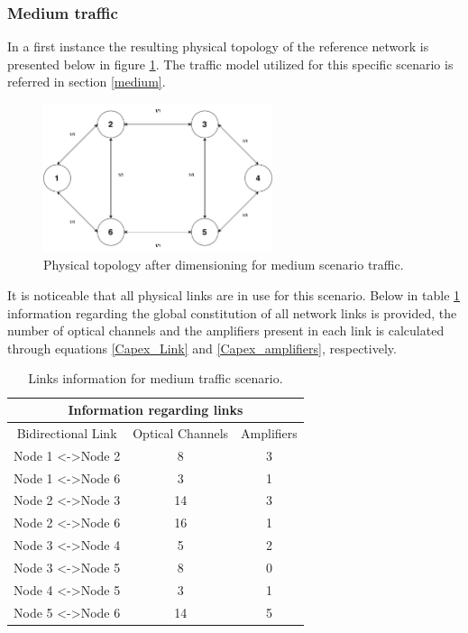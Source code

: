 \subsubsection{Medium traffic}

In a first instance the resulting physical topology of the reference network is presented below in figure \ref{mediumPhysicalTopology}. The traffic model utilized for this specific scenario is referred in section \ref{medium}.

\begin{figure}[H]
  \begin{center}
    \includegraphics[width=0.6\textwidth]{fig/logos/lowPhysicalTopology.pdf}
    \caption{Physical topology after dimensioning for medium scenario traffic.}
  \end{center}
  \label{mediumPhysicalTopology}
\end{figure}

It is noticeable that all physical links are in use for this scenario. Below in table \ref{mediumLinks} information regarding the global constitution of all network links is provided, the number of optical channels and the amplifiers present in each link is calculated through equations \ref{Capex_Link} and \ref{Capex_amplifiers}, respectively.


\begin{table}[H]
\centering
\begin{tabular}{|c|c|c|}
\hline
\multicolumn{3}{|c|}{Information regarding links} \\ \hline
Bidirectional Link & Optical Channels & Amplifiers \\ \hline
Node 1 \textless{}-\textgreater Node 2 & 8 & 3 \\ \hline
Node 1 \textless{}-\textgreater Node 6 & 3 & 1 \\ \hline
Node 2 \textless{}-\textgreater Node 3 & 14 & 3 \\ \hline
Node 2 \textless{}-\textgreater Node 6 & 16 & 1 \\ \hline
Node 3 \textless{}-\textgreater Node 4 & 5 & 2 \\ \hline
Node 3 \textless{}-\textgreater Node 5 & 8 & 0 \\ \hline
Node 4 \textless{}-\textgreater Node 5 & 3 & 1 \\ \hline
Node 5 \textless{}-\textgreater Node 6 & 14 & 5 \\ \hline
\end{tabular}
\caption{Links information for medium traffic scenario.}
\label{mediumLinks}
\end{table}



